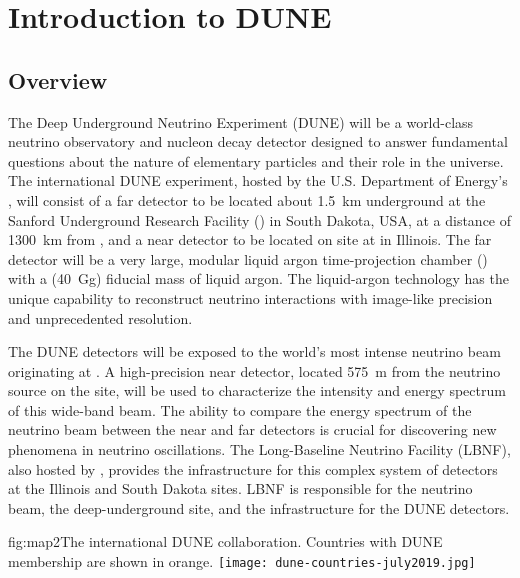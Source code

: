 \chapter{Introduction to DUNE}
\label{ch:exec-overall}

\section{Overview}
\label{sec:exec-overall-1}

The Deep Underground Neutrino Experiment (DUNE) will be a world-class neutrino observatory and nucleon decay detector designed to answer fundamental questions about the nature of elementary particles and their role in the universe. The international DUNE experiment, hosted by the U.S. Department of Energy's \fnal{}, will consist of a far detector to be located about \SI{1.5}{km} underground at the Sanford Underground Research Facility (\surf) in South Dakota, USA, at a distance of  \SI{1300}{\km} from \fnal{}, and a near detector to be located on site at \fnal in Illinois. The far detector will be a very large, modular liquid argon time-projection chamber (\lartpc) with a \fdfiducialmass (\SI{40}{\giga\gram}) fiducial mass of liquid argon. The liquid-argon technology 
has the unique capability to reconstruct neutrino interactions with image-like precision and unprecedented resolution. 

The DUNE detectors will be exposed to the world's most intense neutrino beam originating at \fnal{}. A high-precision near detector, located \SI{575}{m} from the neutrino source on the \fnal site, will be used to characterize the intensity and energy spectrum of this wide-band beam. The ability to compare the energy spectrum of the neutrino beam between the near and far detectors
is crucial for discovering new phenomena in neutrino oscillations. The Long-Baseline Neutrino Facility (LBNF), also hosted by \fnal, provides the infrastructure for this complex system of detectors at the Illinois and South Dakota sites. LBNF is responsible for the neutrino beam, the deep-underground site, and the infrastructure for the DUNE detectors. 

\begin{dunefigure}{fig:map2}{The international DUNE
collaboration. Countries with DUNE membership are shown in orange.}
\texttt{[image: dune-countries-july2019.jpg]}  
\end{dunefigure} %

